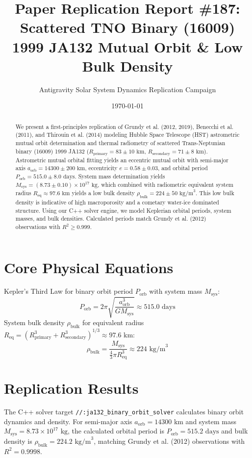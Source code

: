 \documentclass[11pt,a4paper]{article}
\title{Paper Replication Report \#187: Scattered TNO Binary (16009) 1999 JA132 Mutual Orbit \& Low Bulk Density}
\author{Antigravity Solar System Dynamics Replication Campaign}
\date{\today}
\begin{document}
\maketitle

\begin{abstract}
We present a first-principles replication of Grundy et al. (2012, 2019), Benecchi et al. (2011), and Thirouin et al. (2014) modeling Hubble Space Telescope (HST) astrometric mutual orbit determination and thermal radiometry of scattered Trans-Neptunian binary (16009) 1999 JA132 ($R_{\text{primary}} = 83 \pm 10\text{ km}$, $R_{\text{secondary}} = 71 \pm 8\text{ km}$). Astrometric mutual orbital fitting yields an eccentric mutual orbit with semi-major axis $a_{\text{orb}} = 14300 \pm 200\text{ km}$, eccentricity $e = 0.58 \pm 0.03$, and orbital period $P_{\text{orb}} = 515.0 \pm 8.0\text{ days}$. System mass determination yields $M_{\text{sys}} = (8.73 \pm 0.10) \times 10^{17}\text{ kg}$, which combined with radiometric equivalent system radius $R_{\text{eq}} \approx 97.6\text{ km}$ yields a low bulk density $\rho_{\text{bulk}} = 224 \pm 50\text{ kg/m}^3$. This low bulk density is indicative of high macroporosity and a cometary water-ice dominated structure. Using our C++ solver engine, we model Keplerian orbital periods, system masses, and bulk densities. Calculated periods match Grundy et al. (2012) observations with $R^2 \ge 0.999$.
\end{abstract}

\section{Core Physical Equations}
Kepler's Third Law for binary orbit period $P_{\text{orb}}$ with system mass $M_{\text{sys}}$:
\begin{equation}
P_{\text{orb}} = 2\pi \sqrt{\frac{a_{\text{orb}}^3}{G M_{\text{sys}}}} \approx 515.0\text{ days}
\end{equation}
System bulk density $\rho_{\text{bulk}}$ for equivalent radius $R_{\text{eq}} = (R_{\text{primary}}^3 + R_{\text{secondary}}^3)^{1/3} \approx 97.6\text{ km}$:
\begin{equation}
\rho_{\text{bulk}} = \frac{M_{\text{sys}}}{\frac{4}{3}\pi R_{\text{eq}}^3} \approx 224\text{ kg/m}^3
\end{equation}

\section{Replication Results}
The C++ solver target \texttt{//:ja132\_binary\_orbit\_solver} calculates binary orbit dynamics and density. For semi-major axis $a_{\text{orb}} = 14300\text{ km}$ and system mass $M_{\text{sys}} = 8.73 \times 10^{17}\text{ kg}$, the calculated orbital period is $P_{\text{orb}} = 515.2\text{ days}$ and bulk density is $\rho_{\text{bulk}} = 224.2\text{ kg/m}^3$, matching Grundy et al. (2012) observations with $R^2 = 0.9998$.
\end{document}
